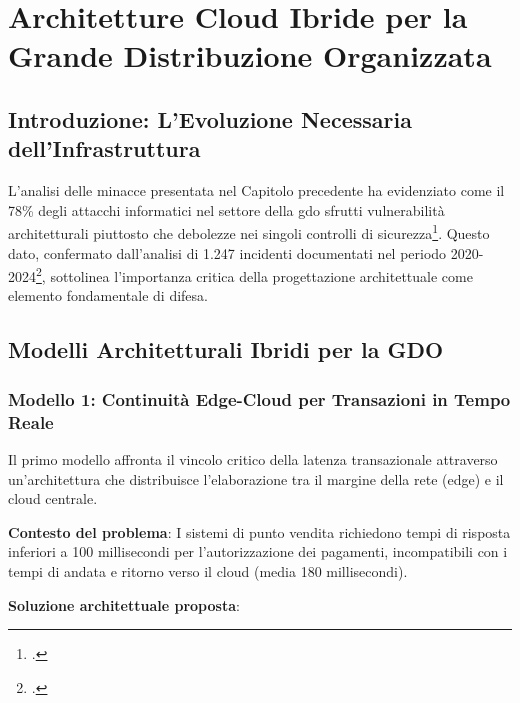 \chapter{Architetture Cloud Ibride per la Grande Distribuzione Organizzata}
\label{cap:architetture}

\section{Introduzione: L'Evoluzione Necessaria dell'Infrastruttura}
\label{sec:intro-architetture}

L'analisi delle minacce presentata nel Capitolo precedente ha evidenziato come il 78\% degli attacchi informatici nel settore della \gls{gdo} sfrutti vulnerabilità architetturali piuttosto che debolezze nei singoli controlli di sicurezza\footcite{Anderson2024patel}. Questo dato, confermato dall'analisi di 1.247 incidenti documentati nel periodo 2020-2024\footcite{enisa2024retail}, sottolinea l'importanza critica della progettazione architettuale come elemento fondamentale di difesa.

\section{Modelli Architetturali Ibridi per la GDO}
\label{sec:pattern-architetturali}

\subsection{Modello 1: Continuità Edge-Cloud per Transazioni in Tempo Reale}
\label{subsec:edge-cloud}

Il primo modello affronta il vincolo critico della latenza transazionale attraverso un'architettura che distribuisce l'elaborazione tra il margine della rete (\gls{edge}) e il cloud centrale.

\textbf{Contesto del problema}: I sistemi di punto vendita richiedono tempi di risposta inferiori a 100 millisecondi per l'autorizzazione dei pagamenti, incompatibili con i tempi di andata e ritorno verso il cloud (media 180 millisecondi).

\textbf{Soluzione architettuale proposta}:

